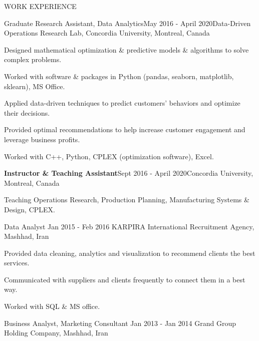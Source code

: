 \documentclass{resume} %
\begin{document}
\begin{rSection}{WORK EXPERIENCE}
\begin{rSubsection}{Graduate Research Assistant, Data Analytics}{May 2016 - April 2020}{Data-Driven Operations Research Lab, Concordia University, Montreal, Canada}{ }
\item Designed mathematical optimization \& predictive models \& algorithms to solve complex problems.
\item Worked with software \& packages in Python (pandas, seaborn, matplotlib, sklearn), MS Office.
\item Applied data-driven techniques to predict customers' behaviors and optimize their decisions.  
\item Provided optimal recommendations to help increase customer engagement and leverage business profits.
\item Worked with C++, Python, CPLEX (optimization software), Excel.
\end{rSubsection}
\begin{rSubsection}
{\bf  Instructor \& Teaching Assistant}{Sept 2016 - April 2020}{Concordia University, Montreal, Canada}{ }  
\item Teaching Operations Research, Production Planning, Manufacturing Systems \& Design, CPLEX.
\end{rSubsection}
\begin{rSubsection} {Data Analyst} {Jan 2015 - Feb 2016}{ KARPIRA International Recruitment Agency, Mashhad, Iran}{} \\
\item Provided data cleaning, analytics and visualization to recommend clients the
best services.
\item Communicated with suppliers and clients frequently to connect them in a best way.
\item Worked with SQL \& MS office.
\end{rSubsection}
\begin{rSubsection} {Business Analyst, Marketing Consultant} {Jan 2013 - Jan 2014}{ Grand Group Holding Company, Mashhad, Iran} {}

\end{rSubsection}
\end{rSection}
\end{document}
